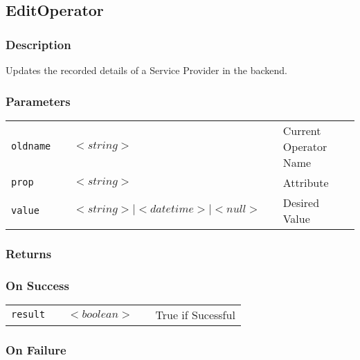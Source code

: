 \subsection{EditOperator}

\subsubsection{Description}

Updates the recorded details of a Service Provider in the backend.

\subsubsection{Parameters}

\begin{tabular}{lllll}
\verb!oldname! & \hspace{15mm} & $<string>$ & \hspace{15mm} & Current Operator Name \\
\verb!prop! & \hspace{15mm} & $<string>$ 
& \hspace{15mm} & Attribute  \\
\verb!value! & \hspace{15mm} & $<string> \mid <datetime> \mid <null>$ & \hspace{15mm} & Desired Value \\
\end{tabular}

\subsubsection{Returns}

\subsubsection{On Success}

\begin{tabular}{lllll}
\verb!result! & \hspace{15mm} & $<boolean>$ & \hspace{15mm} & True if Sucessful \\
\end{tabular}

\subsubsection{On Failure}

